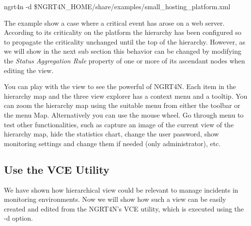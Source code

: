 \documentclass[a4paper,9pt]{article}
\begin{document}
ngrt4n -d \$NGRT4N_HOME/share/examples/small_hosting_platform.xml

The example show a case where a critical event has arose on a web server. According to its criticality on the platform the hierarchy has been configured so to propagate the criticality unchanged until the top of the hierarchy. However, as we will show in the next sub section this behavior can be changed by modifying the \emph{Status Aggregation Rule} property of one or more of its ascendant nodes when editing the view.

You can play with the view to see the powerful of NGRT4N. Each item in the hierarchy map and the three view explorer has a context menu and a tooltip. You can zoom the hierarchy map using the suitable menu from either the toolbar or the menu Map. Alternatively you can use the mouse wheel. Go through menu to test other functionalities, such as capture an image of the current view of the hierarchy map, hide the statistics chart, change the user password, show monitoring settings and change them if needed (only administrator), etc.

\subsection{Use the VCE Utility}
We have shown how hierarchical view could be relevant to manage incidents in monitoring environments. Now we will show how such a view can be easily created and edited from the NGRT4N's VCE utility, which is executed using the -d option. 
\end{document}
